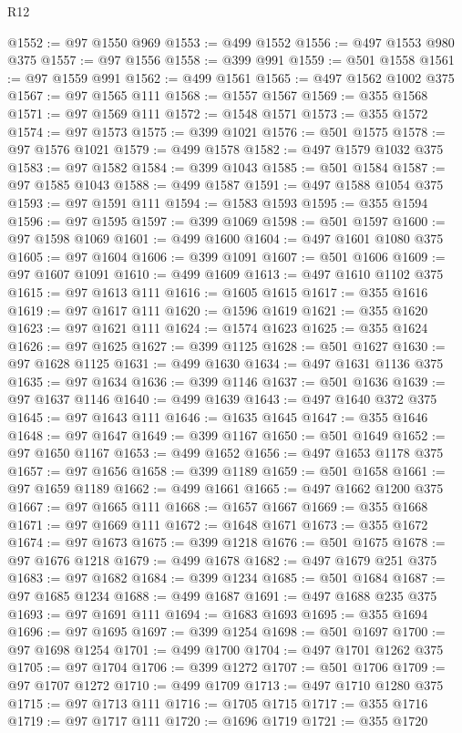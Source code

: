 \begin{lexlean}{R12}
\begin{coremodule}
@1552 := @97 @1550 @969
@1553 := @499 @1552
@1556 := @497 @1553 @980 @375
@1557 := @97 @1556
@1558 := @399 @991
@1559 := @501 @1558
@1561 := @97 @1559 @991
@1562 := @499 @1561
@1565 := @497 @1562 @1002 @375
@1567 := @97 @1565 @111
@1568 := @1557 @1567
@1569 := @355 @1568
@1571 := @97 @1569 @111
@1572 := @1548 @1571
@1573 := @355 @1572
@1574 := @97 @1573
@1575 := @399 @1021
@1576 := @501 @1575
@1578 := @97 @1576 @1021
@1579 := @499 @1578
@1582 := @497 @1579 @1032 @375
@1583 := @97 @1582
@1584 := @399 @1043
@1585 := @501 @1584
@1587 := @97 @1585 @1043
@1588 := @499 @1587
@1591 := @497 @1588 @1054 @375
@1593 := @97 @1591 @111
@1594 := @1583 @1593
@1595 := @355 @1594
@1596 := @97 @1595
@1597 := @399 @1069
@1598 := @501 @1597
@1600 := @97 @1598 @1069
@1601 := @499 @1600
@1604 := @497 @1601 @1080 @375
@1605 := @97 @1604
@1606 := @399 @1091
@1607 := @501 @1606
@1609 := @97 @1607 @1091
@1610 := @499 @1609
@1613 := @497 @1610 @1102 @375
@1615 := @97 @1613 @111
@1616 := @1605 @1615
@1617 := @355 @1616
@1619 := @97 @1617 @111
@1620 := @1596 @1619
@1621 := @355 @1620
@1623 := @97 @1621 @111
@1624 := @1574 @1623
@1625 := @355 @1624
@1626 := @97 @1625
@1627 := @399 @1125
@1628 := @501 @1627
@1630 := @97 @1628 @1125
@1631 := @499 @1630
@1634 := @497 @1631 @1136 @375
@1635 := @97 @1634
@1636 := @399 @1146
@1637 := @501 @1636
@1639 := @97 @1637 @1146
@1640 := @499 @1639
@1643 := @497 @1640 @372 @375
@1645 := @97 @1643 @111
@1646 := @1635 @1645
@1647 := @355 @1646
@1648 := @97 @1647
@1649 := @399 @1167
@1650 := @501 @1649
@1652 := @97 @1650 @1167
@1653 := @499 @1652
@1656 := @497 @1653 @1178 @375
@1657 := @97 @1656
@1658 := @399 @1189
@1659 := @501 @1658
@1661 := @97 @1659 @1189
@1662 := @499 @1661
@1665 := @497 @1662 @1200 @375
@1667 := @97 @1665 @111
@1668 := @1657 @1667
@1669 := @355 @1668
@1671 := @97 @1669 @111
@1672 := @1648 @1671
@1673 := @355 @1672
@1674 := @97 @1673
@1675 := @399 @1218
@1676 := @501 @1675
@1678 := @97 @1676 @1218
@1679 := @499 @1678
@1682 := @497 @1679 @251 @375
@1683 := @97 @1682
@1684 := @399 @1234
@1685 := @501 @1684
@1687 := @97 @1685 @1234
@1688 := @499 @1687
@1691 := @497 @1688 @235 @375
@1693 := @97 @1691 @111
@1694 := @1683 @1693
@1695 := @355 @1694
@1696 := @97 @1695
@1697 := @399 @1254
@1698 := @501 @1697
@1700 := @97 @1698 @1254
@1701 := @499 @1700
@1704 := @497 @1701 @1262 @375
@1705 := @97 @1704
@1706 := @399 @1272
@1707 := @501 @1706
@1709 := @97 @1707 @1272
@1710 := @499 @1709
@1713 := @497 @1710 @1280 @375
@1715 := @97 @1713 @111
@1716 := @1705 @1715
@1717 := @355 @1716
@1719 := @97 @1717 @111
@1720 := @1696 @1719
@1721 := @355 @1720

\end{coremodule}
\end{lexlean}
